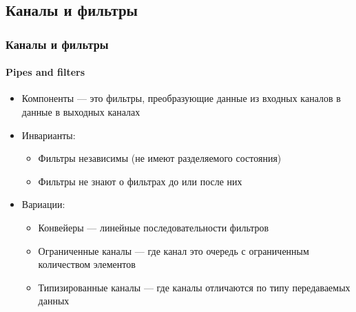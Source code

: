 \documentclass{../../slides-style}
\begin{document}
    \subsection{Каналы и фильтры}

    \begin{frame}
        \frametitle{Каналы и фильтры}
        \framesubtitle{Pipes and filters}
        \begin{itemize}
            \item Компоненты --- это фильтры, преобразующие данные из входных каналов в данные в выходных каналах
            \item Инварианты:
            \begin{itemize}
                \item Фильтры независимы (не имеют разделяемого состояния)
                \item Фильтры не знают о фильтрах до или после них
            \end{itemize}
            \item Вариации:
            \begin{itemize}
                \item Конвейеры --- линейные последовательности фильтров
                \item Ограниченные каналы --- где канал это очередь с ограниченным количеством элементов
                \item Типизированные каналы --- где каналы отличаются по типу передаваемых данных
            \end{itemize}
        \end{itemize}
    \end{frame}
\end{document}
